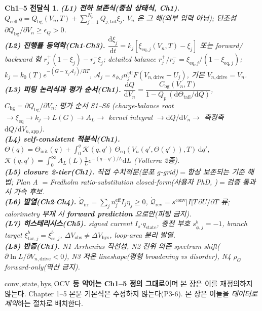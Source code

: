 \documentclass[11pt,a4paper]{article}
\newtheorem*{linkbox}{Ch1--5 전달식}
\newcommand{\dd}{\mathrm{d}}
\newcommand{\eff}{\mathrm{eff}}
\newcommand{\eq}{\mathrm{eq}}
\newcommand{\app}{\mathrm{app}}
\newcommand{\drive}{\mathrm{drive}}
\newcommand{\bg}{\mathrm{bg}}
\newcommand{\cell}{\mathrm{cell}}
\newcommand{\OCV}{\mathrm{OCV}}
\newcommand{\tot}{\mathrm{tot}}
\newcommand{\irr}{\mathrm{irr}}
\newcommand{\rev}{\mathrm{rev}}
\newcommand{\sstat}{\mathrm{ss}}
\newcommand{\conv}{\mathrm{conv}}
\newcommand{\stt}{\mathrm{state}}
\newcommand{\hys}{\mathrm{hys}}
\newcommand{\tar}{\mathrm{tar}}
\newcommand{\obs}{\mathrm{obs}}
\begin{document}
\begin{linkbox}
\textbf{(L1) 전하 보존식(중심 상태식, Ch1).} $Q_\cell\,q=Q_\bg(V_n,T)+\sum_{j=1}^{N_p}Q_{j,\tot}\xi_j$. $V_n$ 은
그 해(외부 입력 아님); 단조성 $\partial Q_\bg/\partial V_n\ge\epsilon_Q>0$.\\
\textbf{(L2) 진행률 동역학(Ch1$\cdot$Ch3).} $\dfrac{\dd\xi_j}{\dd t}=k_j[\xi_{\eq,j}(V_n,T)-\xi_j]$ 또는 forward/
backward 형 $r_j^+(1-\xi_j)-r_j^-\xi_j$; detailed balance $r_j^+/r_j^-=\xi_{\eq,j}/(1-\xi_{\eq,j})$;
$k_j=k_0(T)e^{-(G-\chi_j\mathcal A_j)/RT}$, $\mathcal A_j=s_{\phi,j}n_j^{\eff}F(V_{n,\drive}-U_j)$, 기본 $V_{n,\drive}=V_n$.\\
\textbf{(L3) 피팅 논리식과 평가 순서(Ch1).} $\dfrac{\dd Q}{\dd V_n}=\dfrac{C_\bg(V_n,T)}{1-Q_p\,(\dd\Theta_\mathrm{tail}/\dd Q)}$,
$C_\bg=\partial Q_\bg/\partial V_n$; 평가 순서 S1--S6 (charge-balance root $\to\xi_{\eq}\to k_j\to L(G)\to A_L\to$
kernel integral $\to\dd Q/\dd V_n\to$ 측정축 $\dd Q/\dd V_{n,\app}$).\\
\textbf{(L4) self-consistent 적분식(Ch1).} $\Theta(q)=\Theta_\mathrm{init}(q)+\int_0^q\mathcal K(q,q')\,
\Theta_\eq(V_n(q',\Theta(q')),T)\,\dd q'$, $\mathcal K(q,q')=\int_0^\infty A_L(L)\tfrac1L e^{-(q-q')/L}\dd L$ (Volterra 2종).\\
\textbf{(L5) closure 2-tier(Ch1).} \emph{직접 수치적분}(분포 $g$-grid)$=$항상 보존되는 기준 해법; \emph{Plan A}
$=$Fredholm ratio-substitution closed-form(사용자 PhD, \cite{lee2011,son2013,jcp2017})$=$검증 통과 시 가속 후보.\\
\textbf{(L6) 발열(Ch2$\cdot$Ch4).} $\dot{\mathcal Q}_\irr=\sum_j n_j^{\eff}I_j\eta_j\ge0$, $\dot{\mathcal Q}_\rev=
s^\conv|I|T\,\partial U/\partial T$ 류; calorimetry 부재 시 \textbf{forward prediction} 으로만(피팅 금지).\\
\textbf{(L7) 히스테리시스(Ch5).} signed current $I_s$$\cdot$$q_\stt$, 충전 부호 $s_{\phi,j}^b=-1$, branch target
$\xi_{\tar,j}^b=\xi_{\sstat,j}^b$, $\Delta V_\obs\ne\Delta V_\hys$, loop-area 분리 발열.\\
\textbf{(L8) 반증(Ch1).} N1 Arrhenius 직선성, N2 전위 의존 spectrum shift($\partial\ln L/\partial V_{n,\drive}<0$),
N3 저온 lineshape(평형 broadening vs disorder), N4 $\rho_G$ forward-only(역산 금지).
\end{linkbox}
\noindent\textbf{$\conv,\stt,\hys,\OCV$ 등 약어는 Ch1--5 정의 그대로}이며 본 장은 이를 재정의하지 않는다.
Chapter 1--5 본문 기본식은 수정하지 않는다(P3-6). 본 장은 이들을 \emph{데이터로 제약}하는 절차로 배치한다.
\end{document}
